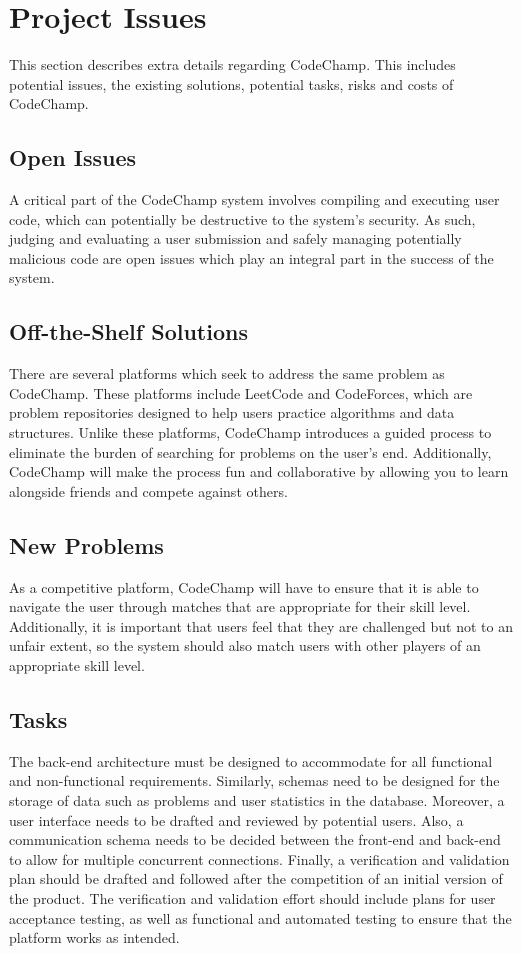 \documentclass[12pt, titlepage]{article}
\begin{document}
\section{Project Issues}

This section describes extra details regarding CodeChamp. This includes potential issues, the existing solutions, potential tasks, risks and costs of CodeChamp.

\subsection{Open Issues}
A critical part of the CodeChamp system involves compiling and executing user code, which can potentially be destructive to the system's security. As such, judging and evaluating a user submission and safely managing potentially malicious code are open issues which play an integral part in the success of the system.

\subsection{Off-the-Shelf Solutions}
There are several platforms which seek to address the same problem as CodeChamp. These platforms include LeetCode\cite{leetcode} and CodeForces\cite{codeforces}, which are problem repositories designed to help users practice algorithms and data structures. Unlike these platforms, CodeChamp introduces a guided process to eliminate the burden of searching for problems on the user's end. Additionally, CodeChamp will make the process fun and collaborative by allowing you to learn alongside friends and compete against others.

\subsection{New Problems}
As a competitive platform, CodeChamp will have to ensure that it is able to navigate the user through matches that are appropriate for their skill level. Additionally, it is important that users feel that they are challenged but not to an unfair extent, so the system should also match users with other players of an appropriate skill level.

\subsection{Tasks}
The back-end architecture must be designed to accommodate for all functional and non-functional requirements. Similarly, schemas need to be designed for the storage of data such as problems and user statistics in the database. Moreover, a user interface needs to be drafted and reviewed by potential users. Also, a communication schema needs to be decided between the front-end and back-end to allow for multiple concurrent connections. Finally, a verification and validation plan should be drafted and followed after the competition of an initial version of the product. The verification and validation effort should include plans for user acceptance testing, as well as functional and automated testing to ensure that the platform works as intended.
\end{document}
